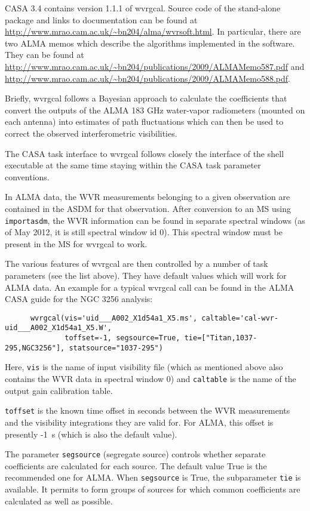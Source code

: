 {CASA 3.4 contains version 1.1.1 of wvrgcal. Source code of the stand-alone package and links 
to documentation can be
found at \url{http://www.mrao.cam.ac.uk/\~bn204/alma/wvrsoft.html}. In particular, there are
two ALMA memos which describe the algorithms implemented in the software. They can be found
at \url{http://www.mrao.cam.ac.uk/\~bn204/publications/2009/ALMAMemo587.pdf} and
\url{http://www.mrao.cam.ac.uk/\~bn204/publications/2009/ALMAMemo588.pdf}.

Briefly, wvrgcal follows a Bayesian approach to calculate the coefficients that convert the outputs of
the ALMA 183 GHz water-vapor radiometers (mounted on each antenna) into estimates of path fluctuations 
which can then be used to correct the observed interferometric visibilities.

The CASA task interface to wvrgcal follows closely the interface of the shell executable
at the same time staying within the CASA task parameter conventions. 

In ALMA data, the WVR measurements belonging to a given observation are contained in the ASDM
for that observation. After conversion to an MS using {\tt importasdm}, the WVR information
can be found in separate spectral windows (as of May 2012, it is still spectral window id 0).
This spectral window must be present in the MS for wvrgcal to work.

The various features of wvrgcal are then controlled by a number of task parameters (see the list above). 
They have default values which will work for ALMA data.
An example for a typical wvrgcal call can be found in the ALMA CASA guide for the NGC 3256 analysis:

\small
\begin{verbatim}
      wvrgcal(vis='uid___A002_X1d54a1_X5.ms', caltable='cal-wvr-uid___A002_X1d54a1_X5.W',  
              toffset=-1, segsource=True, tie=["Titan,1037-295,NGC3256"], statsource="1037-295")
\end{verbatim}
\normalsize

Here, {\tt vis} is the name of input visibility file (which as mentioned above also contains the
WVR data in spectral window 0) and {\tt caltable} is the name of the output gain calibration table.

{\tt toffset} is the known time offset in seconds between the WVR measurements and the visibility integrations
they are valid for. For ALMA, this offset is presently -1~s (which is also the default value).

The parameter {\tt segsource} (segregate source) controls whether separate coefficients are calculated
for each source. The default value True is the recommended one for ALMA.
When {\tt segsource} is True, the subparameter {\tt tie} is available. It permits to form groups of
sources for which common coefficients are calculated as well as possible.

}
